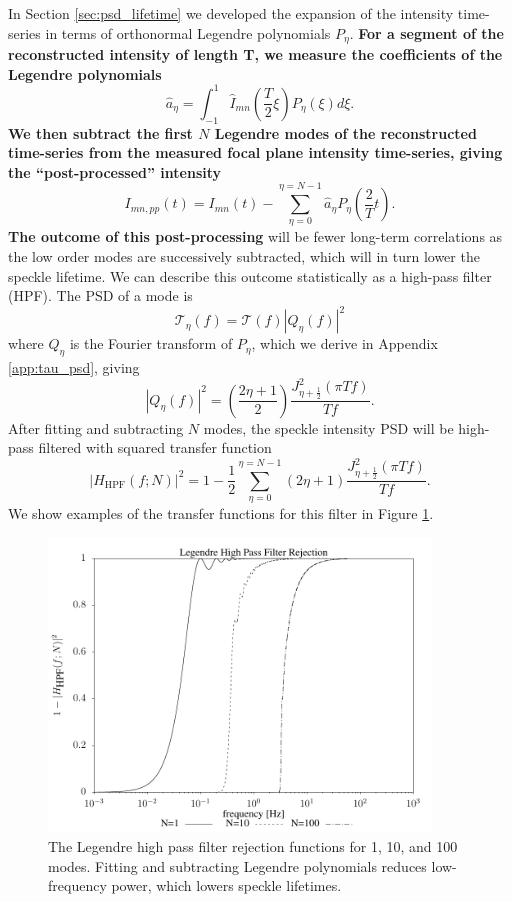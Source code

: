 \documentclass[10pt,preprint]{aastex631}
\begin{document}
In Section \ref{sec:psd_lifetime} we developed the expansion of the intensity time-series in terms of orthonormal Legendre polynomials $P_\eta$.  \textbf{For a segment of the reconstructed intensity of length T, we measure the coefficients of the Legendre polynomials}
\begin{equation}
\hat{a}_\eta = \int_{-1}^1 \hat{I}_{mn}(\frac{T}{2}\xi) P_\eta(\xi) d\xi. 
\end{equation}
\textbf{We then subtract the first $N$ Legendre modes of the reconstructed time-series from the measured focal plane intensity time-series, giving the ``post-processed'' intensity} 
\begin{equation}
I_{mn,pp}(t) = I_{mn}(t) - \sum_{\eta=0}^{\eta=N-1} \hat{a}_\eta P_\eta\left(\frac{2}{T}t\right). 
\end{equation}
\textbf{The outcome of this post-processing} will be fewer long-term correlations as the low order modes are successively subtracted, which will in turn lower the speckle lifetime.  We can describe this outcome statistically as a high-pass filter (HPF).  The PSD of a mode is
\begin{equation}
\mathcal{T}_\eta(f) = \mathcal{T}(f) \left|Q_\eta(f)\right|^2
\end{equation}
where ${Q}_\eta$ is the Fourier transform of $P_\eta$, which we derive in Appendix \ref{app:tau_psd}, giving
\begin{equation}
 \left|Q_\eta(f)\right|^2 = \left(\frac{2\eta+1}{2}\right)\frac{J_{\eta+\frac{1}{2}}^2(\pi T f)}{T f}.
\end{equation}
After fitting and subtracting $N$ modes, the speckle intensity PSD will be high-pass filtered with squared transfer function
\begin{equation}
\left| H_\mathrm{HPF}(f;N) \right| ^2 = 1 - \frac{1}{2}\sum_{\eta=0}^{\eta=N-1} (2\eta+1) \frac{J_{\eta+\frac{1}{2}}^2(\pi T f)}{T f}.
\end{equation}
We show examples of the transfer functions for this filter in Figure \ref{fig:leghpf}.  

\begin{figure}
\centering
\includegraphics[width=4in]{hpf.pdf}
\caption{The Legendre high pass filter rejection functions for 1, 10, and 100 modes. Fitting and subtracting Legendre polynomials reduces low-frequency power, which lowers speckle lifetimes.\label{fig:leghpf}}
\end{figure}
\end{document}
